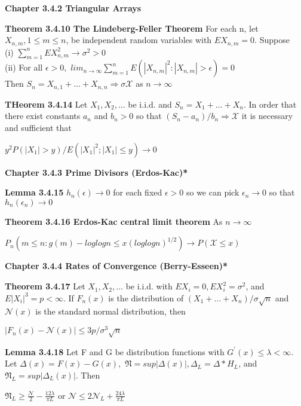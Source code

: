 \documentclass{article}
\newcommand\tab[1][1cm]{\hspace*{#1}}
\begin{document}
\textbf {Chapter 3.4.2 Triangular Arrays}

\textbf {Theorem 3.4.10 The Lindeberg-Feller Theorem} For each n, let $X_{n,m}, 1 \leq m \leq n$, be independent random variables with $EX_{n,m} = 0$. Suppose \\
(i) $\sum_{m=1}^n EX_{n,m}^2 \rightarrow \sigma^2 > 0$ \\
(ii) For all $\epsilon > 0,$ $lim_{n \to \infty} \sum_{m=1}^n E(|X_{n,m}|^2: |X_{n,m}| > \epsilon) = 0$ \\
Then $S_n = X_{n,1} + \dots + X_{n,n} \Rightarrow \sigma \mathcal{X}$ as $n \rightarrow \infty$

\textbf {THeorem 3.4.14} Let $X_1, X_2 ,...$ be i.i.d. and $S_n = X_1 + \dots + X_n$. In order that there exist constants $a_n$ and $b_n > 0$ so that $(S_n - a_n) / b_n \Rightarrow \mathcal{X}$ it is necessary and sufficient that
\begin{center}
$y^2 P(|X_1| > y) / E(|X_1|^2; |X_1| \leq y) \rightarrow 0$
\end{center}

\textbf {Chapter 3.4.3 Prime Divisors (Erdos-Kac)*}

\textbf {Lemma 3.4.15} $h_n(\epsilon) \rightarrow 0$ for each fixed $\epsilon > 0$ so we can pick $\epsilon_n \rightarrow 0$ so that $h_n(\epsilon_n) \rightarrow 0$

\textbf {Theorem 3.4.16 Erdos-Kac central limit theorem} As $n \rightarrow \infty$
\begin{center}
$P_n(m \leq n : g(m) - log log n \leq x(log log n)^{1/2}) \rightarrow P(\mathcal{X} \leq x)$
\end{center}

\textbf {Chapter 3.4.4 Rates of Convergence (Berry-Esseen)*}

\textbf{Theorem 3.4.17} Let $X_1, X_2 ,...$ be i.i.d. with $EX_i = 0, EX_i^2 = \sigma^2$, and $E|X_i|^3 = p < \infty$. If $F_n(x)$ is the distribution of $(X_1 + \dots + X_n) / \sigma \sqrt{n}$ and $\mathcal{N}(x)$ is the standard normal distribution, then
\begin{center}
$|F_n(x) - \mathcal{N} (x) | \leq 3p / \sigma^3 \sqrt{n}$
\end{center}

\textbf {Lemma 3.4.18} Let F and G be distribution functions with $G^{'}(x) \leq \lambda < \infty.$ Let $\Delta(x) = F(x) - G(x),$  $\mathfrak{N} = sup|\Delta(x)|, \Delta_L = \Delta * H_L$, and $\mathfrak{N}_L = sup|\Delta_L (x)|.$ Then

\begin{center}
$\mathfrak{N}_L \geq \frac{\mathcal{N}}{2} - \frac{12 \lambda}{\pi L}$ \tab or \tab $\mathcal{N} \leq 2\mathcal{N}_L + \frac{24 \lambda}{\pi L}$
\end{center}
\end{document}
